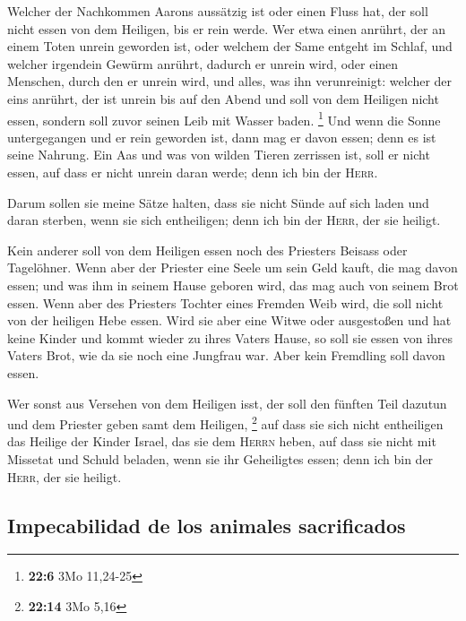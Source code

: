  Welcher der Nachkommen Aarons aussätzig ist oder einen
Fluss hat, der soll nicht essen von dem Heiligen, bis er rein werde. Wer
etwa einen anrührt, der an einem Toten unrein geworden ist, oder welchem
der Same entgeht im Schlaf,  und welcher irgendein Gewürm
anrührt, dadurch er unrein wird, oder einen Menschen, durch den er
unrein wird, und alles, was ihn verunreinigt:  welcher der
eins anrührt, der ist unrein bis auf den Abend und soll von dem Heiligen
nicht essen, sondern soll zuvor seinen Leib mit Wasser baden.
\footnote{\textbf{22:6} 3Mo 11,24-25}  Und wenn die Sonne
untergegangen und er rein geworden ist, dann mag er davon essen; denn es
ist seine Nahrung.  Ein Aas und was von wilden Tieren
zerrissen ist, soll er nicht essen, auf dass er nicht unrein daran
werde; denn ich bin der \textsc{Herr}.

 Darum sollen sie meine Sätze halten, dass sie nicht Sünde
auf sich laden und daran sterben, wenn sie sich entheiligen; denn ich
bin der \textsc{Herr}, der sie heiligt.

 Kein anderer soll von dem Heiligen essen noch des
Priesters Beisass oder Tagelöhner.  Wenn aber der
Priester eine Seele um sein Geld kauft, die mag davon essen; und was ihm
in seinem Hause geboren wird, das mag auch von seinem Brot essen.
 Wenn aber des Priesters Tochter eines Fremden Weib wird,
die soll nicht von der heiligen Hebe essen.  Wird sie
aber eine Witwe oder ausgestoßen und hat keine Kinder und kommt wieder
zu ihres Vaters Hause, so soll sie essen von ihres Vaters Brot, wie da
sie noch eine Jungfrau war. Aber kein Fremdling soll davon essen.

 Wer sonst aus Versehen von dem Heiligen isst, der soll
den fünften Teil dazutun und dem Priester geben samt dem Heiligen,
\footnote{\textbf{22:14} 3Mo 5,16}  auf dass sie sich
nicht entheiligen das Heilige der Kinder Israel, das sie dem
\textsc{Herrn} heben,  auf dass sie nicht mit Missetat
und Schuld beladen, wenn sie ihr Geheiligtes essen; denn ich bin der
\textsc{Herr}, der sie heiligt.

\hypertarget{impecabilidad-de-los-animales-sacrificados}{%
\subsection{Impecabilidad de los animales
sacrificados}\label{impecabilidad-de-los-animales-sacrificados}}

